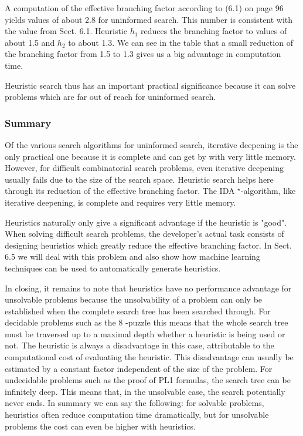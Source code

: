 \documentclass[10pt]{article}
\begin{document}
A computation of the effective branching factor according to (6.1) on page 96 yields values of about 2.8 for uninformed search. This number is consistent with the value from Sect. 6.1. Heuristic $h_{1}$ reduces the branching factor to values of about 1.5 and $h_{2}$ to about 1.3. We can see in the table that a small reduction of the branching factor from 1.5 to 1.3 gives us a big advantage in computation time.

Heuristic search thus has an important practical significance because it can solve problems which are far out of reach for uninformed search.

\subsubsection*{Summary}
Of the various search algorithms for uninformed search, iterative deepening is the only practical one because it is complete and can get by with very little memory. However, for difficult combinatorial search problems, even iterative deepening usually fails due to the size of the search space. Heuristic search helps here through its reduction of the effective branching factor. The IDA ${ }^{\star}$-algorithm, like iterative deepening, is complete and requires very little memory.

Heuristics naturally only give a significant advantage if the heuristic is "good". When solving difficult search problems, the developer's actual task consists of designing heuristics which greatly reduce the effective branching factor. In Sect. 6.5 we will deal with this problem and also show how machine learning techniques can be used to automatically generate heuristics.

In closing, it remains to note that heuristics have no performance advantage for unsolvable problems because the unsolvability of a problem can only be established when the complete search tree has been searched through. For decidable problems such as the 8 -puzzle this means that the whole search tree must be traversed up to a maximal depth whether a heuristic is being used or not. The heuristic is always a disadvantage in this case, attributable to the computational cost of evaluating the heuristic. This disadvantage can usually be estimated by a constant factor independent of the size of the problem. For undecidable problems such as the proof of PL1 formulas, the search tree can be infinitely deep. This means that, in the unsolvable case, the search potentially never ends. In summary we can say the following: for solvable problems, heuristics often reduce computation time dramatically, but for unsolvable problems the cost can even be higher with heuristics.
\end{document}
